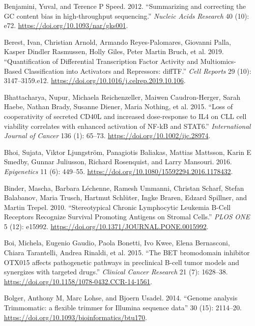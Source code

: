 \documentclass[11pt, a4paper, twosided]{book}
\newenvironment{CSLReferences}%
  {}%
  {\par}
\begin{document}
\begin{CSLReferences}{1}{0}
\leavevmode{}%
Benjamini, Yuval, and Terence P Speed. 2012. {``{Summarizing and correcting the GC content bias in high-throughput sequencing.}''} \emph{Nucleic Acids Research} 40 (10): e72. \url{https://doi.org/10.1093/nar/gks001}.

\leavevmode{}%
Berest, Ivan, Christian Arnold, Armando Reyes-Palomares, Giovanni Palla, Kasper Dindler Rasmussen, Holly Giles, Peter Martin Bruch, et al. 2019. {``{Quantification of Differential Transcription Factor Activity and Multiomics-Based Classification into Activators and Repressors: diffTF}.''} \emph{Cell Reports} 29 (10): 3147--3159.e12. \url{https://doi.org/10.1016/j.celrep.2019.10.106}.

\leavevmode{}%
Bhattacharya, Nupur, Michaela Reichenzeller, Maiwen Caudron-Herger, Sarah Haebe, Nathan Brady, Susanne Diener, Maria Nothing, et al. 2015. {``{Loss of cooperativity of secreted CD40L and increased dose-response to IL4 on CLL cell viability correlates with enhanced activation of NF-kB and STAT6}.''} \emph{International Journal of Cancer} 136 (1): 65--73. \url{https://doi.org/10.1002/ijc.28974}.

\leavevmode{}%
Bhoi, Sujata, Viktor Ljungström, Panagiotis Baliakas, Mattias Mattsson, Karin E Smedby, Gunnar Juliusson, Richard Rosenquist, and Larry Mansouri. 2016. \emph{Epigenetics} 11 (6): 449--55. \url{https://doi.org/10.1080/15592294.2016.1178432}.

\leavevmode{}%
Binder, Mascha, Barbara Léchenne, Ramesh Ummanni, Christan Scharf, Stefan Balabanov, Maria Trusch, Hartmut Schlüter, Ingke Braren, Edzard Spillner, and Martin Trepel. 2010. {``{Stereotypical Chronic Lymphocytic Leukemia B-Cell Receptors Recognize Survival Promoting Antigens on Stromal Cells}.''} \emph{PLOS ONE} 5 (12): e15992. \url{https://doi.org/10.1371/JOURNAL.PONE.0015992}.

\leavevmode{}%
Boi, Michela, Eugenio Gaudio, Paola Bonetti, Ivo Kwee, Elena Bernasconi, Chiara Tarantelli, Andrea Rinaldi, et al. 2015. {``{The BET bromodomain inhibitor OTX015 affects pathogenetic pathways in preclinical B-cell tumor models and synergizes with targeted drugs}.''} \emph{Clinical Cancer Research} 21 (7): 1628--38. \url{https://doi.org/10.1158/1078-0432.CCR-14-1561}.

\leavevmode{}%
Bolger, Anthony M, Marc Lohse, and Bjoern Usadel. 2014. {``{Genome analysis Trimmomatic: a flexible trimmer for Illumina sequence data}''} 30 (15): 2114--20. \url{https://doi.org/10.1093/bioinformatics/btu170}.


\end{CSLReferences}
\end{document}
